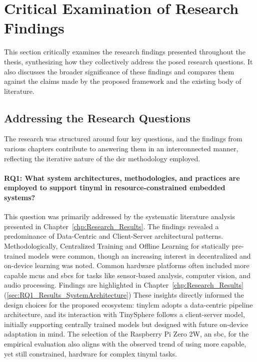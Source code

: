 \section{Critical Examination of Research Findings}
\label{sec:critical_examination_findings}

This section critically examines the research findings presented throughout the thesis, synthesizing how they collectively address the posed research questions. It also discusses the broader significance of these findings and compares them against the claims made by the proposed framework and the existing body of literature.

\subsection{Addressing the Research Questions}
\label{ssec:addressing_rqs}

The research was structured around four key questions, and the findings from various chapters contribute to answering them in an interconnected manner, reflecting the iterative nature of the \gls{dsr} methodology employed.

\paragraph{RQ1: What system architectures, methodologies, and practices are employed to support \gls{tinyml} in resource-constrained embedded systems?}
This question was primarily addressed by the systematic literature analysis presented in Chapter~\ref{chp:Research_Results}. The findings revealed a predominance of Data-Centric and Client-Server architectural patterns. Methodologically, Centralized Training and Offline Learning for statically pre-trained models were common, though an increasing interest in decentralized and on-device learning was noted. Common hardware platforms often included more capable \glspl{mcu} and \glspl{sbc} for tasks like sensor-based analysis, computer vision, and audio processing. Findings are highlighted in Chapter~\ref{chp:Research_Results} (\ref{sec:RQ1_Results_SystemArchitecture}) These insights directly informed the design choices for the proposed ecosystem: \gls{tinylcm} adopts a data-centric pipeline architecture, and its interaction with TinySphere follows a client-server model, initially supporting centrally trained models but designed with future on-device adaptation in mind. The selection of the Raspberry Pi Zero 2W, an \gls{sbc}, for the empirical evaluation also aligns with the observed trend of using more capable, yet still constrained, hardware for complex \gls{tinyml} tasks.


